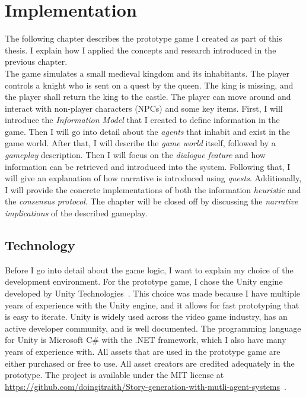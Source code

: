 \chapter{Implementation}
The following chapter describes the prototype game I created as part of this thesis. I explain how I applied the concepts and research introduced in the previous chapter.\\
The game simulates a small medieval kingdom and its inhabitants. The player controls a knight who is sent on a quest by the queen. The king is missing, and the player shall return the king to the castle. The player can move around and interact with non-player characters (NPCs) and some key items. First, I will introduce the \textit{Information Model} that I created to define information in the game. Then I will go into detail about the \textit{agents} that inhabit and exist in the game world. After that, I will describe the \textit{game world} itself, followed by a \textit{gameplay} description. Then I will focus on the \textit{dialogue feature} and how information can be retrieved and introduced into the system. Following that, I will give an explanation of how narrative is introduced using \textit{quests}. Additionally, I will provide the concrete implementations of both the information \textit{heuristic} and the \textit{consensus protocol}. The chapter will be closed off by discussing the \textit{narrative implications} of the described gameplay.
\section{Technology}
Before I go into detail about the game logic, I want to explain my choice of the development environment. For the prototype game, I chose the Unity engine developed by Unity Technologies~\cite{Unity2021}. This choice was made because I have multiple years of experience with the Unity engine, and it allows for fast prototyping that is easy to iterate. Unity is widely used across the video game industry, has an active developer community, and is well documented. The programming language for Unity is Microsoft C\# with the .NET framework, which I also have many years of experience with. All assets that are used in the prototype game are either purchased or free to use. All asset creators are credited adequately in the prototype. The project is available under the MIT license at \url{https://github.com/doingitraith/Story-generation-with-mutli-agent-systems}~\cite{prototype}.
